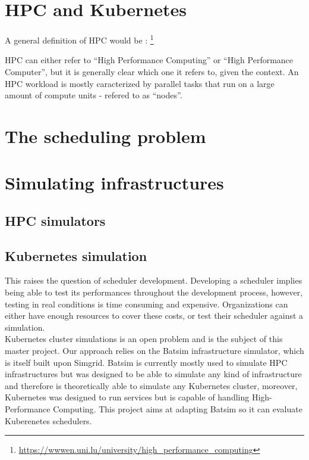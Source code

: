 \documentclass[12pt]{report}
\begin{document}
\section{HPC and Kubernetes}
A general definition of HPC would be :
\footnote{\url{https://wwwen.uni.lu/university/high_performance_computing}}

HPC can either refer to ``High Performance Computing'' or ``High Performance
Computer'', but it is generally clear which one it refers to, given the
context.
An HPC workload is mostly caracterized by parallel tasks that run on a large
amount of compute units - refered to as ``nodes''.




\section{The scheduling problem}

\section{Simulating infrastructures}
\subsection{HPC simulators}
\subsection{Kubernetes simulation}

This raises the question of scheduler development. Developing a scheduler
implies being able to test its performances throughout the development process,
however, testing in real conditions is time consuming and expensive.
Organizations can either have enough resources to cover these costs, or test
their scheduler against a simulation.\\

Kubernetes cluster simulations is an open problem and is the subject of this
master project. Our approach relies on the Batsim\cite{batsim} infrastructure
simulator, which is itself built upon Simgrid\cite{simgrid}. Batsim is
currently mostly used to simulate HPC infrastructures but was designed to be
able to simulate any kind of infrastructure and therefore is theoretically able
to simulate any Kubernetes cluster, moreover, Kubernetes was designed to run
services but is capable of handling High-Performance
Computing\cite{kube-for-hpc}. This project aims at adapting Batsim so it can
evaluate Kuberenetes schedulers.
\end{document}
